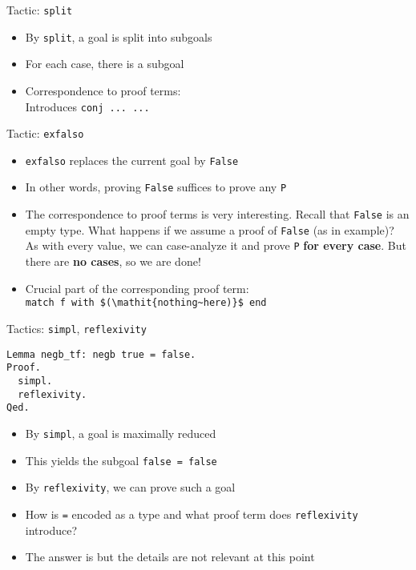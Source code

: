 \begin{frame}[fragile]{Tactic: \lstinline|split|}

\begin{itemize}
  \item By \lstinline|split|, a goal is split into subgoals
  \pause
  \item For each case, there is a subgoal
  \pause
  \item Correspondence to proof terms:\\
  Introduces \lstinline&conj ... ...&
\end{itemize}
\end{frame}

\begin{frame}[fragile]{Tactic: \lstinline|exfalso|}

\begin{itemize}
  \item \lstinline|exfalso| replaces the current goal by \lstinline|False|
  \pause
  \item In other words, proving \lstinline|False| suffices to prove any \lstinline|P|
  \pause
  \item The correspondence to proof terms is very interesting. Recall that \lstinline|False| is an empty type. What happens if we assume a proof of \lstinline|False| (as in example)? As with every value, we can case-analyze it and prove \lstinline|P| \textbf{for every case}. But there are \textbf{no cases}, so we are done!
  \pause
  \item Crucial part of the corresponding proof term:\\
  \lstinline[mathescape=true]|match f with $(\mathit{nothing~here)}$ end|
\end{itemize}
\end{frame}

\begin{frame}[fragile]{Tactics: \lstinline|simpl|, \lstinline|reflexivity|}
\begin{lstlisting}
Lemma negb_tf: negb true = false.
Proof.
  simpl.
  reflexivity.
Qed.
\end{lstlisting}
\begin{itemize}
  \item By \lstinline|simpl|, a goal is maximally reduced
  \pause
  \item This yields the subgoal \lstinline|false =|~\lstinline|false|
  \pause
  \item By \lstinline|reflexivity|, we can prove such a goal
  \pause
  \item How is \lstinline|=| encoded as a type and what proof term does \lstinline|reflexivity| introduce?
  \pause
  \item The answer is  but the details are not relevant at this point
\end{itemize}
\end{frame}

